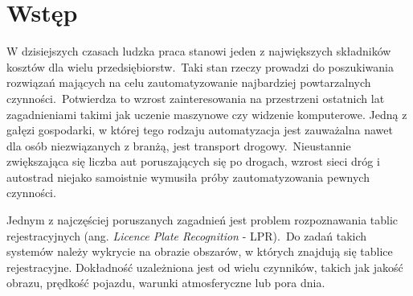 %


\chapter*{Wstęp}

%
%

W dzisiejszych czasach ludzka praca stanowi jeden z największych składników kosztów dla wielu przedsiębiorstw.\ Taki stan rzeczy prowadzi do poszukiwania rozwiązań mających na celu zautomatyzowanie najbardziej powtarzalnych czynności.\ Potwierdza to wzrost zainteresowania na przestrzeni ostatnich lat zagadnieniami takimi jak uczenie maszynowe czy widzenie komputerowe.
Jedną z gałęzi gospodarki, w której tego rodzaju automatyzacja jest zauważalna nawet dla osób niezwiązanych z branżą, jest transport drogowy.\ Nieustannie zwiększająca się liczba aut poruszających się po drogach, wzrost sieci dróg i autostrad niejako samoistnie wymusiła próby zautomatyzowania pewnych czynności.

Jednym z najczęściej poruszanych zagadnień jest problem rozpoznawania tablic rejestracyjnych (ang. \textit{Licence Plate Recognition} - LPR).\ Do zadań takich systemów należy wykrycie na obrazie obszarów, w których znajdują się tablice rejestracyjne.
Dokładność uzależniona jest od wielu czynników, takich jak jakość obrazu, prędkość pojazdu, warunki atmosferyczne lub pora dnia.

